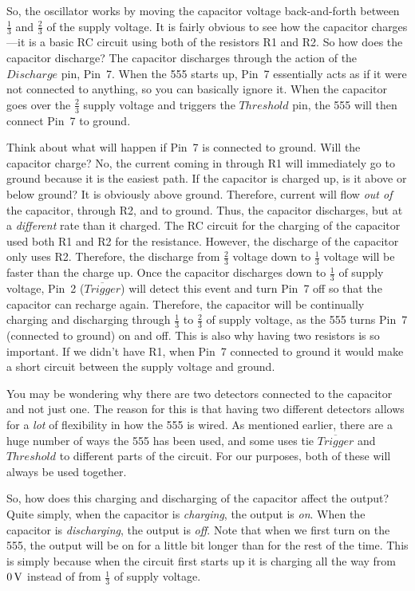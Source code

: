 So, the oscillator works by moving the capacitor voltage back-and-forth between $\frac{1}{3}$ and $\frac{2}{3}$ of the supply voltage.
It is fairly obvious to see how the capacitor charges---it is a basic RC circuit using both of the resistors R1 and R2.
So how does the capacitor discharge?
The capacitor discharges through the action of the $Discharge$ pin, Pin~7.
When the 555 starts up, Pin~7 essentially acts as if it were not connected to anything, so you can basically ignore it.
When the capacitor goes over the $\frac{2}{3}$ supply voltage and triggers the $Threshold$ pin, the 555 will then connect Pin~7 to ground.

Think about what will happen if Pin~7 is connected to ground.
Will the capacitor charge?
No, the current coming in through R1 will immediately go to ground because it is the easiest path.
If the capacitor is charged up, is it above or below ground?
It is obviously above ground.
Therefore, current will flow \emph{out of} the capacitor, through R2, and to ground.
Thus, the capacitor discharges, but at a \emph{different} rate than it charged.
The RC circuit for the charging of the capacitor used both R1 and R2 for the resistance.
However, the discharge of the capacitor only uses R2.
Therefore, the discharge from $\frac{2}{3}$ voltage down to $\frac{1}{3}$ voltage will be faster than the charge up.
Once the capacitor discharges down to $\frac{1}{3}$ of supply voltage, Pin~2 ($\overline{Trigger}$) will detect this event and turn Pin~7 off so that the capacitor can recharge again.
Therefore, the capacitor will be continually charging and discharging through $\frac{1}{3}$ to $\frac{2}{3}$ of supply voltage, as the 555 turns Pin~7 (connected to ground) on and off.
This is also why having two resistors is so important.
If we didn't have R1, when Pin~7 connected to ground it would make a short circuit between the supply voltage and ground.

You may be wondering why there are two detectors connected to the capacitor and not just one.
The reason for this is that having two different detectors allows for a \emph{lot} of flexibility in how the 555 is wired.
As mentioned earlier, there are a huge number of ways the 555 has been used, and some uses tie $\overline{Trigger}$ and $Threshold$ to different parts of the circuit.
For our purposes, both of these will always be used together.

So, how does this charging and discharging of the capacitor affect the output?
Quite simply, when the capacitor is \emph{charging}, the output is \emph{on}.
When the capacitor is \emph{discharging}, the output is \emph{off}.
Note that when we first turn on the 555, the output will be on for a little bit longer than for the rest of the time.
This is simply because when the circuit first starts up it is charging all the way from $0\,\si{\volt}$ instead of from $\frac{1}{3}$ of supply voltage.

